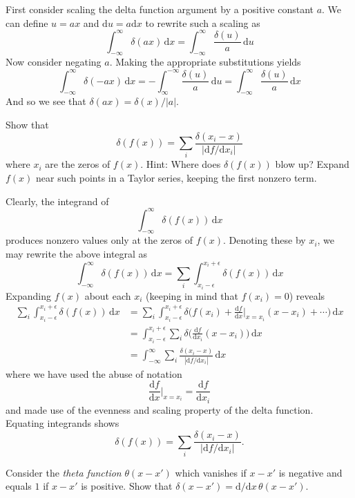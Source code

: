 \documentclass[../principles-of-quantum-mechanics.tex]{subfiles}
\begin{document}
\begin{questions}
\begin{solution}
	First consider scaling the delta function argument by a positive constant $a$. We can define $u = ax$ and $\mathrm{d}u = a\mathrm{d}x$ to rewrite such a scaling as
	\[
		\int_{-\infty}^{\infty}\delta(ax)\,\mathrm{d}x = \int_{-\infty}^{\infty}\frac{\delta(u)}{a}\,\mathrm{d}u
	\]
	Now consider negating $a$. Making the appropriate substitutions yields
	\[
	\int_{-\infty}^{\infty}\delta(-ax)\,\mathrm{d}x = -\int_{\infty}^{-\infty}\frac{\delta(u)}{a}\,\mathrm{d}u = \int_{-\infty}^{\infty}\frac{\delta(u)}{a}\,\mathrm{d}x
	\]
	And so we see that $\delta(ax) = \delta(x)/|a|$.
\end{solution}

\question Show that
\[
	\delta(f(x)) = \sum_i \frac{\delta(x_i - x)}{|\mathrm{d}f/\mathrm{d}x_i|}
\]
where $x_i$ are the zeros of $f(x)$. Hint: Where does $\delta(f(x))$ blow up? Expand $f(x)$ near such points in a Taylor series, keeping the first nonzero term.

\begin{solution}
	Clearly, the integrand of
	\[
		\int_{-\infty}^{\infty}\delta(f(x))\,\mathrm{d}x
	\]
	produces nonzero values only at the zeros of $f(x)$. Denoting these by $x_i$, we may rewrite the above integral as
	\[
		\int_{-\infty}^{\infty}\delta(f(x))\,\mathrm{d}x = \sum_i\int_{x_i-\epsilon}^{x_i+\epsilon}\delta(f(x))\,\mathrm{d}x
	\]
	Expanding $f(x)$ about each $x_i$ (keeping in mind that $f(x_i)=0$) reveals
	\begin{align*}
		\sum_i\int_{x_i-\epsilon}^{x_i+\epsilon}\delta(f(x))\,\mathrm{d}x &= \sum_i\int_{x_i-\epsilon}^{x_i+\epsilon}\delta\Big(f(x_i) + \frac{\mathrm{d}f}{\mathrm{d}x}\Big|_{x=x_i}(x - x_i) + \cdots\Big)\,\mathrm{d}x \\
		&= \int_{x_i-\epsilon}^{x_i+\epsilon}\sum_i\delta\Big(\frac{\mathrm{d}f}{\mathrm{d}x_i}(x - x_i)\Big)\,\mathrm{d}x \\
		&= \int_{-\infty}^{\infty}\sum_i\frac{\delta(x_i - x)}{|\mathrm{d}f/\mathrm{d}x_i|}\,\mathrm{d}x
	\end{align*}
	where we have used the abuse of notation 
	\[
		\frac{\mathrm{d}f}{\mathrm{d}x}\Big|_{x=x_i} = \frac{\mathrm{d}f}{\mathrm{d}x_i}
	\]
	and made use of the evenness and scaling property of the delta function. Equating integrands shows
	\[
	\delta(f(x)) = \sum_i \frac{\delta(x_i - x)}{|\mathrm{d}f/\mathrm{d}x_i|}.
	\]
\end{solution}

\question Consider the \textit{theta function} $\theta(x-x')$ which vanishes if $x-x'$ is negative and equals $1$ if $x-x'$ is positive. Show that $\delta(x - x') = \mathrm{d}/\mathrm{d}x\,\theta(x-x')$.


\end{questions}
\end{document}
